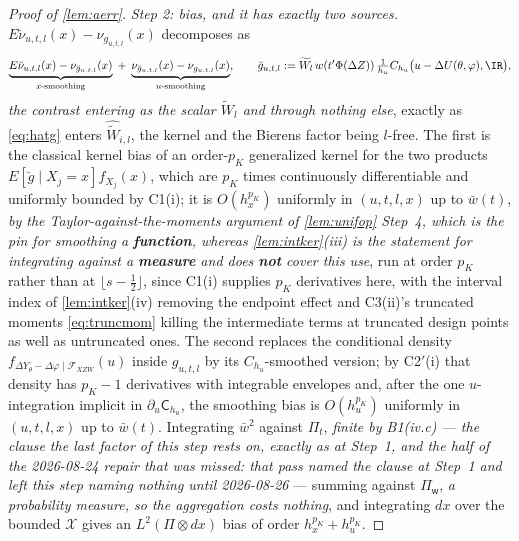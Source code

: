 \begin{proof}[Proof of \cref{lem:aerr}]
\emph{Step 2: bias, and it has exactly two sources.} $E\breve\nu_{u,t,l}(x)-\nu_{g_{u,t,l}}(x)$ decomposes
as
\[
\underbrace{E\breve\nu_{u,t,l}(x)-\nu_{\breve g_{u,t,l}}(x)}_{\text{$x$-smoothing}}
\;+\;\underbrace{\nu_{\breve g_{u,t,l}}(x)-\nu_{g_{u,t,l}}(x)}_{\text{$u$-smoothing}},
\qquad
\breve g_{u,t,l}:=\widetilde W_l\,w(t'\Phi(\Delta Z))\,\tfrac1{h_u}C_{h_u}\big(u-\Delta U(\theta,\varphi),\IR\big),
\]
\emph{the contrast entering as the scalar $\widetilde W_l$ and through nothing else}, exactly as
\eqref{eq:hatg} enters $\widehat{\widetilde W}_{i,l}$, the kernel and the Bierens factor being $l$-free.
The first is the classical kernel bias of an order-$p_K$ generalized kernel for the two products
$E[\breve g\mid X_j=x]f_{X_j}(x)$, which are $p_K$ times continuously differentiable and uniformly
bounded by C1(i); it is $O(h_x^{p_K})$ uniformly in $(u,t,l,x)$ up to $\bar w(t)$, \emph{by the
Taylor-against-the-moments argument of \cref{lem:unifop} Step~4, which is the pin for smoothing a
\textbf{function}, whereas \cref{lem:intker}(iii) is the statement for integrating against a
\textbf{measure} and does \textbf{not} cover this use}, run at order $p_K$ rather than
at $\lfloor s-\tfrac12\rfloor$, since C1(i) supplies $p_K$ derivatives here, with the interval index of
\cref{lem:intker}(iv) removing the endpoint effect and C3(ii)'s truncated moments \eqref{eq:truncmom}
killing the intermediate terms at truncated design points as well as untruncated ones.
The second replaces the conditional density
$f_{\Delta Y_\theta-\Delta\varphi\mid\mathcal F_{XZW}}(u)$ inside $g_{u,t,l}$ by its $C_{h_u}$-smoothed
version; by C2$'$(i) that density has $p_K-1$ derivatives with integrable envelopes and, after the one
$u$-integration implicit in $\partial_u\mathsf C_{h_u}$, the smoothing bias is $O(h_u^{p_K})$ uniformly
in $(u,t,l,x)$ up to $\bar w(t)$. Integrating $\bar w^{2}$ against $\Pi_t$, \emph{finite by
\textup{B1(iv.c)} --- the clause the last factor of this step rests on, exactly as at Step~1, and the
half of the 2026-08-24 repair that was missed: that pass named the clause at Step~1 and left this step
naming nothing until 2026-08-26} --- summing against
$\Pi_{\mathsf w}$, \emph{a probability measure, so the aggregation costs nothing}, and
integrating $dx$ over the bounded
$\mathcal X$ gives an $L^{2}(\Pi\otimes dx)$ bias of order $h_x^{p_K}+h_u^{p_K}$.


\end{proof}
